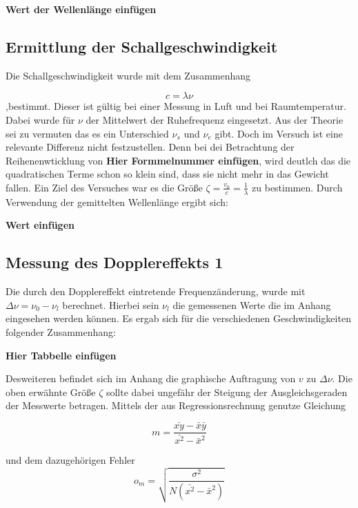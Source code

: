 \documentclass[parskip=half]{scrartcl} %
\begin{document}
\textbf{Wert der Wellenlänge einfügen}

\subsection{Ermittlung der Schallgeschwindigkeit}
Die Schallgeschwindigkeit wurde mit dem Zusammenhang

\begin{equation}
c=\lambda \nu
\end{equation}
,bestimmt. Dieser ist gültig bei einer Messung in Luft und bei Raumtemperatur.
Dabei wurde für $\nu$ der Mittelwert der Ruhefrequenz eingesetzt.
Aus der Theorie sei zu vermuten das es ein Unterschied $\nu_s$ und $\nu_e$ gibt.
Doch im Versuch ist eine relevante Differenz nicht festzustellen. 
Denn bei dei Betrachtung der Reihenenwticklung von \textbf{Hier Formmelnummer einfügen},
wird deutlch das die quadratischen Terme schon so klein sind, dass sie nicht mehr in
das Gewicht fallen. Ein Ziel des Versuches war es die Größe $\zeta=\frac{v_0}{c}=\frac{1}{\lambda}$
zu bestimmen.
Durch Verwendung der gemittelten Wellenlänge ergibt sich:

\textbf{Wert einfügen}

\subsection{Messung des Dopplereffekts 1}
Die durch den Dopplereffekt eintretende Frequenzänderung, wurde 
mit $\Delta \nu=\nu_0-\nu_l$ berechnet. Hierbei sein $\nu_l$ die 
gemessenen Werte die im Anhang eingesehen werden können.
Es ergab sich für die verschiedenen Geschwindigkeiten folgender Zusammenhang:

\textbf{Hier Tabbelle einfügen}

Desweiteren befindet sich im Anhang die graphische Auftragung 
von $v$ zu $\Delta \nu$. 
Die oben erwähnte Größe $\zeta$ sollte dabei ungefähr der 
Steigung der Ausgleichsgeraden der Messwerte betragen.
Mittels der aus Regressionsrechnung genutze Gleichung

\begin{equation*}
m=\frac{\bar{xy}-\bar{x}\bar{y}}{\bar{x^2}-\bar{x}^2}
\end{equation*}

und dem dazugehörigen Fehler
\begin{equation*}
o_m=\sqrt{\frac{\sigma^2}{N(\bar{x^2}-\bar{x}^2)}}
\end{equation*}
\end{document}
